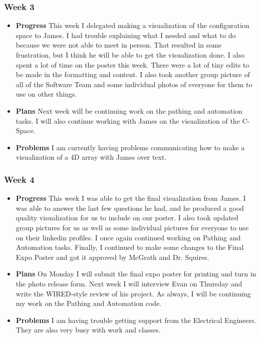 \subsubsection{Week 3}
\begin{itemize}
\item{
\textbf{Progress}
This week I delegated making a visualization of the configuration space to James. I had trouble explaining what I needed and what to do because we were not able to meet in person. That resulted in some frustration, but I think he will be able to get the visualization done. I also spent a lot of time on the poster this week. There were a lot of tiny edits to be made in the formatting and content. I also took another group picture of all of the Software Team and some individual photos of everyone for them to use on other things.
}
\item{
\textbf{Plans}
Next week will be continuing work on the pathing and automation tasks. I will also continue working with James on the visualization of the C-Space.
}
\item{
\textbf{Problems}
I am currently having problems communicating how to make a visualization of a 4D array with James over text.
}
\end{itemize}

\subsubsection{Week 4}
\begin{itemize}
\item{
\textbf{Progress}
This week I was able to get the final visualization from James. I was able to answer the last few questions he had, and he produced a good quality visualization for us to include on our poster. I also took updated group pictures for us as well as some individual pictures for everyone to use on their linkedin profiles. I once again continued working on Pathing and Automation tasks. Finally, I continued to make some changes to the Final Expo Poster and got it approved by McGrath and Dr. Squires.
}
\item{
\textbf{Plans}
On Monday I will submit the final expo poster for printing and turn in the photo release form. Next week I will interview Evan on Thursday and write the WIRED-style review of his project. As always, I will be continuing my work on the Pathing and Automation code.
}
\item{
\textbf{Problems}
I am having trouble getting support from the Electrical Engineers. They are also very busy with work and classes.
}
\end{itemize}

